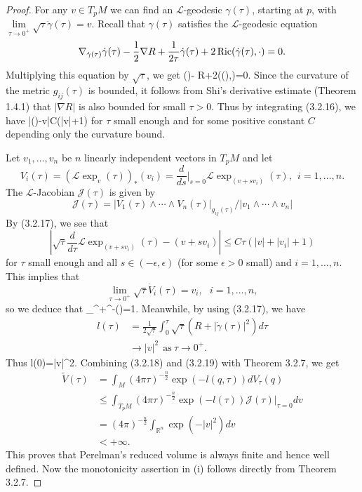 \begin{proof}
For any $v\in T_pM$ we can find an $\mathcal{L}$-geodesic
$\gamma(\tau)$, starting at $p$, with
$\lim\limits_{\tau\rightarrow0^+}\sqrt{\tau}\dot{\gamma}(\tau)=v$.
Recall that $\gamma(\tau)$ satisfies the $\mathcal{L}$-geodesic
equation
$$
\nabla_{\dot{\gamma}(\tau)}\dot{\gamma}(\tau)-\frac{1}{2}\nabla
R+\frac{1}{2\tau}\dot{\gamma}(\tau)+2\operatorname{Ric}(\dot{\gamma}(\tau),\cdot)=0.
$$
Multiplying this equation by $\sqrt{\tau}$, we get \be
{}(\sqrt{\tau}\dot{\gamma})-\sqrt{\tau}\nabla
R+2\Ric(\sqrt{\tau}\dot{\gamma}(\tau),\cdot)=0.%
\ee Since the curvature of the metric $g_{ij}(\tau)$ is bounded,
it follows from Shi's derivative estimate (Theorem 1.4.1) that
$|\nabla R|$ is also bounded for small $\tau>0$. Thus by
integrating (3.2.16), we have \be
|\sqrt{\tau}\dot{\gamma}(\tau)-v|\leq C\tau(|v|+1) %
\ee for $\tau$ small enough and for some positive constant $C$
depending only the curvature bound.

Let $v_1,\ldots,v_n$ be $n$ linearly independent vectors in $T_pM$
and let
$$
V_i(\tau)=(\mathcal{L}\exp_v(\tau))_*(v_i)
=\frac{d}{ds}|_{s=0}\mathcal{L}\exp_{(v+sv_i)}(\tau),\ \
i=1,\ldots,n.
$$
The $\mathcal{L}$-Jacobian $\mathcal{J}(\tau)$ is given by
$$
\mathcal{J}(\tau)=|V_1(\tau)\wedge\cdots\wedge
V_n(\tau)|_{g_{ij}(\tau)}/|v_1\wedge\cdots\wedge v_n|
$$
By (3.2.17), we see that
$$
\left|\sqrt{\tau}\frac{d}{d\tau}\mathcal{L}
\exp_{(v+sv_i)}(\tau)-(v+sv_i)\right| \leq C\tau (|v|+|v_i|+1)
$$
for $\tau$ small enough and all $s\in(-\epsilon,\epsilon)$ (for
some $\epsilon>0$ small) and $i=1,\ldots,n$. This implies that
$$
\lim\limits_{\tau\rightarrow0^+}\sqrt{\tau}\dot{V}_i(\tau) =v_i,\
\ \ i=1,\ldots,n,
$$
so we deduce that \be
\lim\limits_{\tau{}^+}\tau^{-}(\tau)=1.
\ee Meanwhile, by using (3.2.17), we have
\begin{displaymath}
\begin{split}
l(\tau)&  =\frac{1}{2\sqrt{\tau}}\int_0^\tau\sqrt{\tau}
(R+|\dot{\gamma}(\tau)|^2)d\tau\\
&  \rightarrow |v|^2\ \ \text{as}\ \tau\rightarrow0^+.
\end{split}
\end{displaymath}
Thus \be
l(0)=|v|^2.%
\ee Combining (3.2.18) and (3.2.19) with Theorem 3.2.7, we get
\begin{displaymath}
\begin{split}
\tilde{V}(\tau)
&  =\int_M(4\pi\tau)^{-\frac{n}{2}}\exp(-l(q,\tau))dV_{\tau}(q) \\
&  \leq\int_{T_pM}(4\pi\tau)^{-\frac{n}{2}}
\exp(-l(\tau))\mathcal{J}(\tau)|_{\tau=0}dv\\
&  =(4\pi)^{-\frac{n}{2}}\int_{\mathbb{R}^n}\exp(-|v|^2)dv\\
&  <+\infty.
\end{split}
\end{displaymath}
This proves that Perelman's reduced volume is always finite and
hence well defined. Now the monotonicity assertion in (i) follows
directly from Theorem 3.2.7.


\end{proof}
